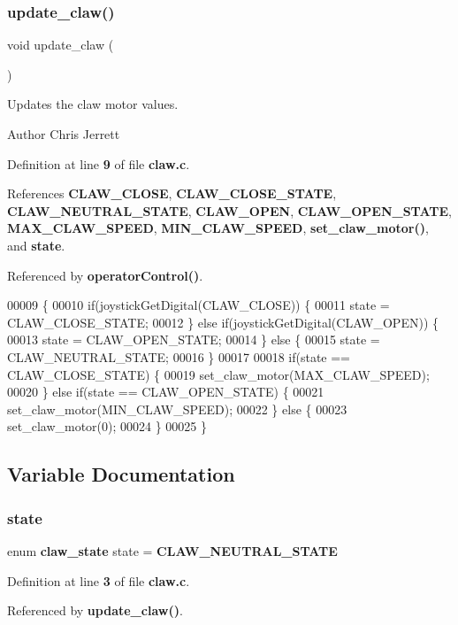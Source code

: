 \subsubsection{update\+\_\+claw()}
{\footnotesize\ttfamily void update\+\_\+claw (\begin{DoxyParamCaption}{ }\end{DoxyParamCaption})}



Updates the claw motor values. 

\begin{DoxyAuthor}{Author}
Chris Jerrett 
\end{DoxyAuthor}


Definition at line \textbf{ 9} of file \textbf{ claw.\+c}.



References \textbf{ C\+L\+A\+W\+\_\+\+C\+L\+O\+SE}, \textbf{ C\+L\+A\+W\+\_\+\+C\+L\+O\+S\+E\+\_\+\+S\+T\+A\+TE}, \textbf{ C\+L\+A\+W\+\_\+\+N\+E\+U\+T\+R\+A\+L\+\_\+\+S\+T\+A\+TE}, \textbf{ C\+L\+A\+W\+\_\+\+O\+P\+EN}, \textbf{ C\+L\+A\+W\+\_\+\+O\+P\+E\+N\+\_\+\+S\+T\+A\+TE}, \textbf{ M\+A\+X\+\_\+\+C\+L\+A\+W\+\_\+\+S\+P\+E\+ED}, \textbf{ M\+I\+N\+\_\+\+C\+L\+A\+W\+\_\+\+S\+P\+E\+ED}, \textbf{ set\+\_\+claw\+\_\+motor()}, and \textbf{ state}.



Referenced by \textbf{ operator\+Control()}.


\begin{DoxyCode}
00009                    \{
00010   \textcolor{keywordflow}{if}(joystickGetDigital(CLAW_CLOSE)) \{
00011     state = CLAW_CLOSE_STATE;
00012   \} \textcolor{keywordflow}{else} \textcolor{keywordflow}{if}(joystickGetDigital(CLAW_OPEN)) \{
00013     state = CLAW_OPEN_STATE;
00014   \} \textcolor{keywordflow}{else} \{
00015     state = CLAW_NEUTRAL_STATE;
00016   \}
00017 
00018   \textcolor{keywordflow}{if}(state == CLAW_CLOSE_STATE) \{
00019     set_claw_motor(MAX_CLAW_SPEED);
00020   \} \textcolor{keywordflow}{else} \textcolor{keywordflow}{if}(state == CLAW_OPEN_STATE) \{
00021     set_claw_motor(MIN_CLAW_SPEED);
00022   \} \textcolor{keywordflow}{else} \{
00023     set_claw_motor(0);
00024   \}
00025 \}
\end{DoxyCode}


\subsection{Variable Documentation}
\mbox{\label{claw_8c_a70d16bb05218682b0a5eaabb141e9d8f}} 
\subsubsection{state}
{\footnotesize\ttfamily enum \textbf{ claw\+\_\+state} state = \textbf{ C\+L\+A\+W\+\_\+\+N\+E\+U\+T\+R\+A\+L\+\_\+\+S\+T\+A\+TE}\hspace{0.3cm}{\ttfamily [static]}}



Definition at line \textbf{ 3} of file \textbf{ claw.\+c}.



Referenced by \textbf{ update\+\_\+claw()}.

